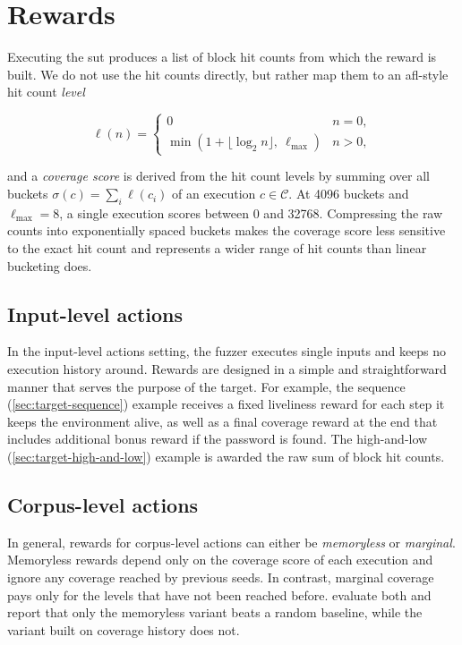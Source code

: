 
\section{Rewards}\label{sec:mdp-rewards}

Executing the \gls{sut} produces a list of block hit counts from which the reward is built.
We do not use the hit counts directly, but rather map them to an \gls{afl}-style hit count \emph{level}

\begin{equation*}
  \ell(n)=
  \begin{cases}
    0 & n=0, \\
    \min\left(1+\lfloor\log_2 n\rfloor,\ \ell_{\max}\right) & n>0,
  \end{cases}
\end{equation*}

and a \emph{coverage score} is derived from the hit count levels by summing over all buckets
$\sigma(c)=\sum_i\ell(c_i)$ of an execution $c\in\mathcal{C}$.
At 4096 buckets and $\ell_{\max}=8$, a single execution scores between 0 and 32768.
Compressing the raw counts into exponentially spaced buckets makes the coverage score less sensitive
to the exact hit count and represents a wider range of hit counts than linear
bucketing does.

\subsection{Input-level actions}

In the input-level actions setting, the fuzzer executes single inputs and keeps no execution history around.
Rewards are designed in a simple and straightforward manner that serves the purpose of the target.
For example, the sequence (\cref{sec:target-sequence}) example receives a fixed liveliness reward for
each step it keeps the environment alive, as well as a final coverage reward at the end that
includes additional bonus reward if the password is found.
The high-and-low (\cref{sec:target-high-and-low}) example is awarded the raw sum of block hit counts.

\subsection{Corpus-level actions}

In general, rewards for corpus-level actions can either be \emph{memoryless}
or \emph{marginal}.
Memoryless rewards depend only on the coverage score of each execution and ignore
any coverage reached by previous seeds.
In contrast, marginal coverage pays only for the levels that have not been reached before.
\Textcite{bottinger_deep_2018} evaluate both and report that only the memoryless variant
beats a random baseline, while the variant built on coverage history does not.

